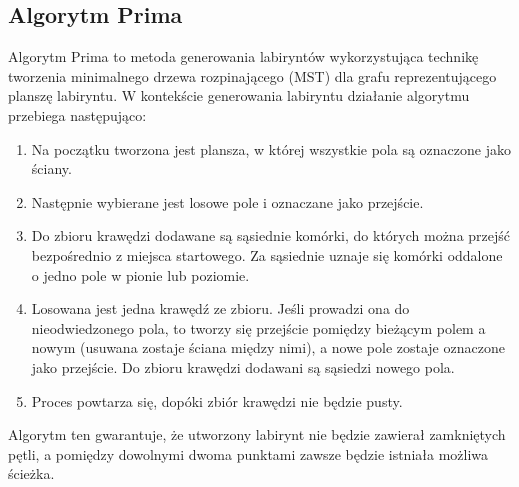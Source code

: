 \subsection{Algorytm Prima}

Algorytm Prima to metoda generowania labiryntów wykorzystująca technikę tworzenia minimalnego drzewa rozpinającego (MST) dla grafu reprezentującego planszę labiryntu.
W kontekście generowania labiryntu działanie algorytmu przebiega następująco:

\begin{enumerate}
    \item Na początku tworzona jest plansza, w której wszystkie pola są oznaczone jako ściany.
    
    

    \item Następnie wybierane jest losowe pole i oznaczane jako przejście.
    
    

    \clearpage

    \item Do zbioru krawędzi dodawane są sąsiednie komórki, do których można przejść bezpośrednio z miejsca startowego. Za sąsiednie uznaje się komórki oddalone o jedno pole w pionie lub poziomie.
    
    

    \item Losowana jest jedna krawędź ze zbioru. Jeśli prowadzi ona do nieodwiedzonego pola, to tworzy się przejście pomiędzy bieżącym polem a nowym (usuwana zostaje ściana między nimi), a nowe pole zostaje oznaczone jako przejście. Do zbioru krawędzi dodawani są sąsiedzi nowego pola.

    

    \item Proces powtarza się, dopóki zbiór krawędzi nie będzie pusty.
    
    
\end{enumerate}

Algorytm ten gwarantuje, że utworzony labirynt nie będzie zawierał zamkniętych pętli, a pomiędzy dowolnymi dwoma punktami zawsze będzie istniała możliwa ścieżka.

\clearpage